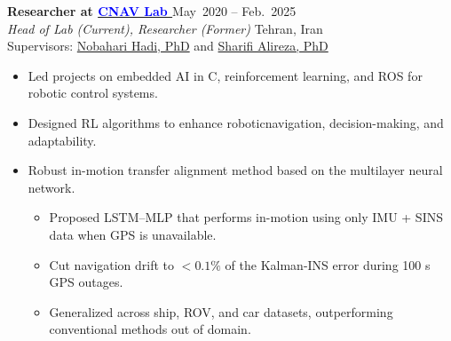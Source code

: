 \documentclass[12pt]{article}
\begin{document}
\noindent
{\bfseries Researcher at
\href{https://www.linkedin.com/company/cnav-lab/}{\textcolor{blue}{CNAV Lab \faLinkedin}} \href{https://github.com/CNAVLAB}{\faGithub}
\textcolor{red}{
\href{https://youtube.com/@cnavlab?si=Fc-Y3oyKdgAmz3-5}{\faYoutube}}
} \hfill May\ 2020 -- Feb.\ 2025 \\[2pt]
\noindent \textit{Head of Lab (Current), Researcher (Former)}
\hfill Tehran, Iran \\[2pt]
\noindent Supervisors:
\href{https://ae.sharif.edu/~portal/faculty/1091235256}{Nobahari Hadi, PhD} and
\href{https://ae.sharif.edu/~portal/faculty/1730782165}{Sharifi Alireza, PhD}
\vspace{-4pt}
\begin{itemize}  \itemsep 1pt %
    \item Led projects on {embedded AI} in C, {reinforcement learning}, and {ROS} for robotic control systems.
	\item Designed {RL} algorithms to enhance robotic{navigation}, {decision-making}, and adaptability.
    \item Robust in-motion transfer alignment method based on the multilayer neural network. \href{https://github.com/alibaniasad1999/INS-AI}{\faGithub}
\vspace{-6pt}
    \begin{itemize}
		\item Proposed {LSTM–MLP} that performs in-motion using only IMU + SINS data when GPS is unavailable.
    \item Cut navigation drift to \(\!<\!0.1\%\) of the Kalman-INS error during 100 s GPS outages.
    \item Generalized across ship, ROV, and car datasets, outperforming conventional methods out of domain.
    \end{itemize}
\end{itemize}
\end{document}

